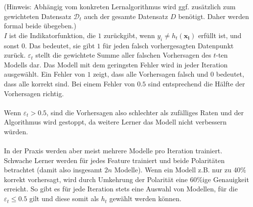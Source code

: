 
(Hinweis: Abhängig vom konkreten Lernalgorithmus wird ggf. zusätzlich zum gewichteten Datensatz $\mathcal{D}_t$
auch der gesamte Datensatz $D$ benötigt. Daher werden formal beide übegeben.)\\

$I$ ist die Indikatorfunktion, die $1$ zurückgibt, wenn $y_i\neq h_t(\boldsymbol{x_i})$ erfüllt ist, und
sonst $0$. Das bedeutet, sie gibt $1$ für jeden falsch vorhergesagten Datenpunkt zurück. $\varepsilon_t$
stellt die gewichtete Summe aller falschen Vorhersagen des $t$-ten Modells dar. Das Modell
mit dem geringsten Fehler wird in jeder Iteration ausgewählt. Ein Fehler von $1$ zeigt, dass alle
Vorhersagen falsch und $0$ bedeutet, dass alle korrekt sind.
Bei einem Fehler von $0.5$ sind entsprechend die Hälfte der Vorhersagen richtig. \\\\
Wenn $\varepsilon_t > 0.5$, sind die Vorhersagen also schlechter
als zufälliges Raten und der Algorithmus wird gestoppt,
da weitere Lerner das Modell nicht verbessern würden.\\\\
In der Praxis werden aber meist mehrere Modelle pro Iteration trainiert. Schwache Lerner werden für jedes Feature trainiert und beide Polaritäten betrachtet (damit also insgesamt
$2n$ Modelle). Wenn ein Modell z.B. nur zu 40\% korrekt vorhersagt, wird durch Umkehrung der Polarität eine 60\%ige Genauigkeit erreicht. So gibt es für
jede Iteration stets eine Auswahl von Modellen, für die $\varepsilon_t\leq0.5$ gilt und diese somit als $h_t$ gewählt werden können.